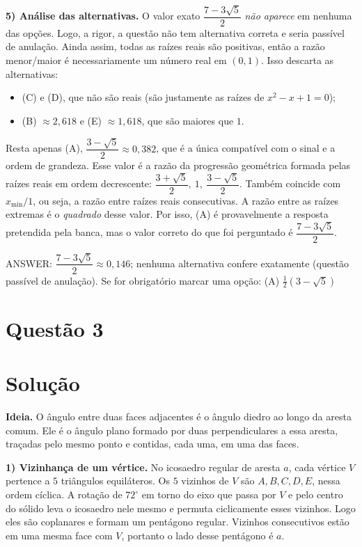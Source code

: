 \documentclass{article}%
\begin{document}
\textbf{5) Análise das alternativas.} O valor exato $\dfrac{7-3\sqrt5}{2}$ \emph{não aparece} em nenhuma das opções. Logo, a rigor, a questão não tem alternativa correta e seria passível de anulação. Ainda assim, todas as raízes reais são positivas, então a razão menor/maior é necessariamente um número real em $(0,1)$. Isso descarta as alternativas:
\begin{itemize}
\item (C) e (D), que não são reais (são justamente as raízes de $x^2-x+1=0$);
\item (B) $\approx 2{,}618$ e (E) $\approx 1{,}618$, que são maiores que $1$.
\end{itemize}
Resta apenas (A), $\dfrac{3-\sqrt5}{2}\approx0{,}382$, que é a única compatível com o sinal e a ordem de grandeza. Esse valor é a razão da progressão geométrica formada pelas raízes reais em ordem decrescente: $\dfrac{3+\sqrt5}{2},\ 1,\ \dfrac{3-\sqrt5}{2}$. Também coincide com $x_{\min}/1$, ou seja, a razão entre raízes reais consecutivas. A razão entre as raízes extremas é o \emph{quadrado} desse valor. Por isso, (A) é provavelmente a resposta pretendida pela banca, mas o valor correto do que foi perguntado é $\dfrac{7-3\sqrt5}{2}$.

\medskip
ANSWER: $\dfrac{7-3\sqrt5}{2}\approx 0{,}146$; nenhuma alternativa confere exatamente (questão passível de anulação). Se for obrigatório marcar uma opção: (A) $\frac{1}{2}(3-\sqrt5)$%
\newpage%
\section*{Questão 3}

\section*{Solução}

\textbf{Ideia.} O ângulo entre duas faces adjacentes é o ângulo diedro ao longo da aresta comum. Ele é o ângulo plano formado por duas perpendiculares a essa aresta, traçadas pelo mesmo ponto e contidas, cada uma, em uma das faces.

\textbf{1) Vizinhança de um vértice.} No icosaedro regular de aresta $a$, cada vértice $V$ pertence a $5$ triângulos equiláteros. Os $5$ vizinhos de $V$ são $A,B,C,D,E$, nessa ordem cíclica. A rotação de $72^\circ$ em torno do eixo que passa por $V$ e pelo centro do sólido leva o icosaedro nele mesmo e permuta ciclicamente esses vizinhos. Logo eles são coplanares e formam um pentágono regular. Vizinhos consecutivos estão em uma mesma face com $V$, portanto o lado desse pentágono é $a$.
\end{document}
